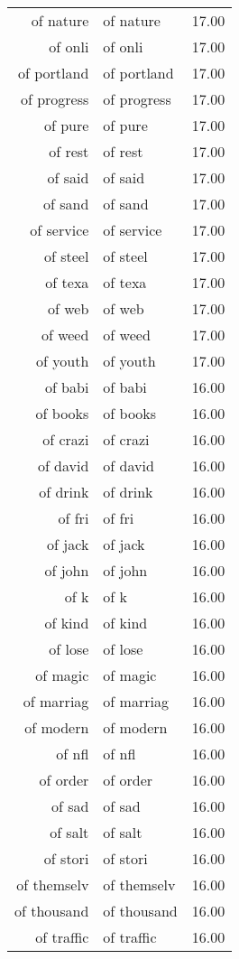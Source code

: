 \begin{table}[ht]
\begin{tabular}{rlr}
  of nature & of nature & 17.00 \\ 
  of onli & of onli & 17.00 \\ 
  of portland & of portland & 17.00 \\ 
  of progress & of progress & 17.00 \\ 
  of pure & of pure & 17.00 \\ 
  of rest & of rest & 17.00 \\ 
  of said & of said & 17.00 \\ 
  of sand & of sand & 17.00 \\ 
  of service & of service & 17.00 \\ 
  of steel & of steel & 17.00 \\ 
  of texa & of texa & 17.00 \\ 
  of web & of web & 17.00 \\ 
  of weed & of weed & 17.00 \\ 
  of youth & of youth & 17.00 \\ 
  of babi & of babi & 16.00 \\ 
  of books & of books & 16.00 \\ 
  of crazi & of crazi & 16.00 \\ 
  of david & of david & 16.00 \\ 
  of drink & of drink & 16.00 \\ 
  of fri & of fri & 16.00 \\ 
  of jack & of jack & 16.00 \\ 
  of john & of john & 16.00 \\ 
  of k & of k & 16.00 \\ 
  of kind & of kind & 16.00 \\ 
  of lose & of lose & 16.00 \\ 
  of magic & of magic & 16.00 \\ 
  of marriag & of marriag & 16.00 \\ 
  of modern & of modern & 16.00 \\ 
  of nfl & of nfl & 16.00 \\ 
  of order & of order & 16.00 \\ 
  of sad & of sad & 16.00 \\ 
  of salt & of salt & 16.00 \\ 
  of stori & of stori & 16.00 \\ 
  of themselv & of themselv & 16.00 \\ 
  of thousand & of thousand & 16.00 \\ 
  of traffic & of traffic & 16.00 \\ 

\end{tabular}
\end{table}
